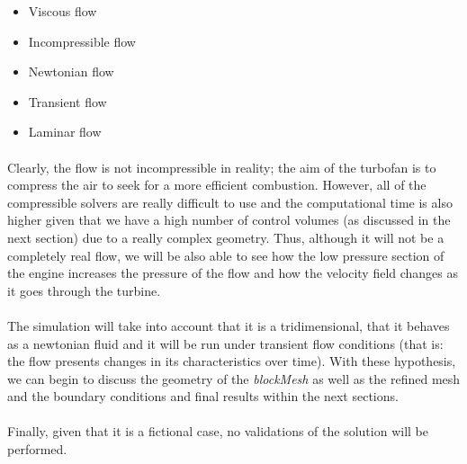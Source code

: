 \begin{itemize}
	\item Viscous flow
	\item Incompressible flow
	\item Newtonian flow
	\item Transient flow
	\item Laminar flow
\end{itemize}

\paragraph{}Clearly, the flow is not incompressible in reality; the aim of the turbofan is to compress the air to seek for a more efficient combustion. However, all of the compressible solvers are really difficult to use and the computational time is also higher given that we have a high number of control volumes (as discussed in the next section) due to a really complex geometry. Thus, although it will not be a completely real flow, we will be also able to see how the low pressure section of the engine increases the pressure of the flow and how the velocity field changes as it goes through the turbine.

\paragraph{}The simulation will take into account that it is a tridimensional, that it behaves as a newtonian fluid and it will be run under transient flow conditions (that is: the flow presents changes in its characteristics over time). With these hypothesis, we can begin to discuss the geometry of the \textit{blockMesh} as well as the refined mesh and the boundary conditions and final results within the next sections.

\paragraph{}Finally, given that it is a fictional case, no validations of the solution will be performed.